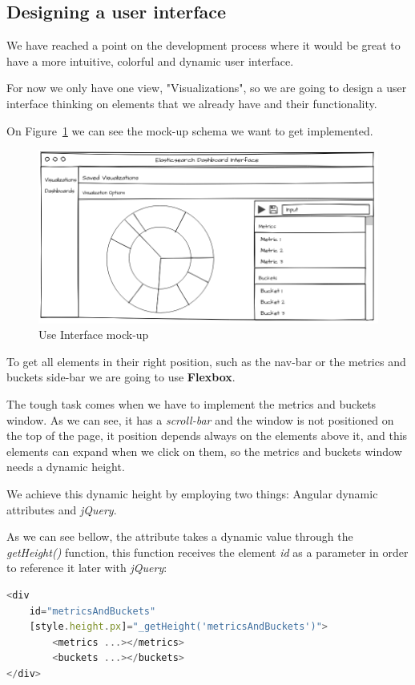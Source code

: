 \documentclass[a4paper, 12pt, english]{book}
\begin{document}
\subsection{Designing a user interface}
\label{sec:pie-chart}

We have reached a point on the development process where it would be great to have a more intuitive, colorful and dynamic user interface.

For now we only have one view,  "Visualizations", so we are going to design a user interface thinking on elements that we already have and their functionality.

On Figure~\ref{fig:user-interface-mockup} we can see the mock-up schema we want to get implemented.
\begin{figure}
  \centering
  \includegraphics[width=15cm, keepaspectratio]{img/user_interface_mockup}
  \caption{Use Interface mock-up}
  \label{fig:user-interface-mockup}
\end{figure}

To get all elements in their right position, such as the nav-bar or the metrics and buckets side-bar we are going to use \textbf{Flexbox}.

The tough task comes when we have to implement the metrics and buckets window. As we can see, it has a \textit{scroll-bar} and the window is not positioned on the top of the page, it position depends always on the elements above it, and this elements can expand when we click on them, so the metrics and buckets window needs a dynamic height.

We achieve this dynamic height by employing two things: Angular dynamic attributes and \textit{jQuery}.

As we can see bellow, the attribute takes a dynamic value through the \textit{getHeight()} function, this function receives the element \textit{id} as a parameter in order to reference it later with \textit{jQuery}:
\begin{lstlisting}[language=javascript, caption=Dynamic height with Angular, label=code:angular-dynamic-heigh]
<div
    id="metricsAndBuckets"
    [style.height.px]="_getHeight('metricsAndBuckets')">
        <metrics ...></metrics>
        <buckets ...></buckets>
</div>
\end{lstlisting}
\end{document}
